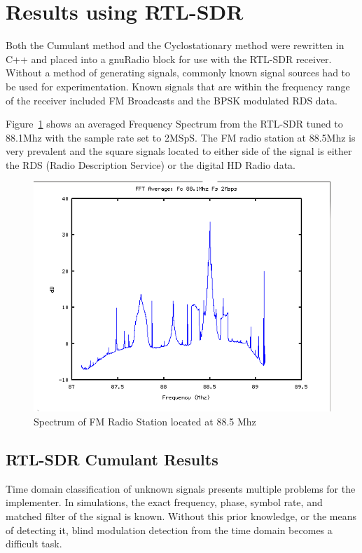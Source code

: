 \section{Results using RTL-SDR}

Both the Cumulant method and the Cyclostationary method were rewritten in C++
and placed into a gnuRadio block for use with the RTL-SDR receiver.  Without a
method of generating signals, commonly known signal sources had to be used for
experimentation.  Known signals that are within the frequency range of
the receiver included FM Broadcasts and the BPSK modulated RDS data.

Figure~\ref{fig:SignalOfInterest} shows an averaged Frequency Spectrum from the
RTL-SDR tuned to 88.1Mhz with the sample rate set to 2MSpS.  The FM radio
station at 88.5Mhz is very prevalent and the square signals located to either
side of the signal is either the RDS (Radio Description Service) or the
digital HD Radio data.  

\begin{figure}
\centering
\includegraphics[width=\linewidth]{../img/Report_RTL_SDR_FFT_881M_2Msps.png}
\caption{Spectrum of FM Radio Station located at 88.5 Mhz}
\label{fig:SignalOfInterest}
\end{figure}


\subsection{RTL-SDR Cumulant Results}

Time domain classification of unknown signals presents multiple problems
for the implementer.  In simulations, the exact frequency, phase, symbol rate,
and matched filter of the signal is known.  Without this prior knowledge, or the
means of detecting it, blind modulation detection from the time domain becomes a
difficult task.
 
